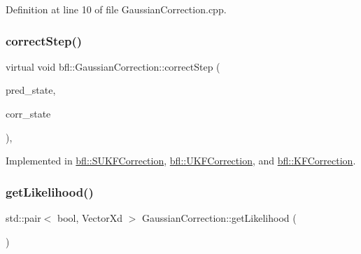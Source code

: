 Definition at line 10 of file Gaussian\+Correction.\+cpp.

\mbox{\label{classbfl_1_1GaussianCorrection_af30322d949e8135e1ec243bd6df00c18}} 
\subsubsection{\texorpdfstring{correct\+Step()}{correctStep()}}
{\footnotesize\ttfamily virtual void bfl\+::\+Gaussian\+Correction\+::correct\+Step (\begin{DoxyParamCaption}\item[{const \mbox{\hyperlink{classbfl_1_1GaussianMixture}{Gaussian\+Mixture}} \&}]{pred\+\_\+state,  }\item[{\mbox{\hyperlink{classbfl_1_1GaussianMixture}{Gaussian\+Mixture}} \&}]{corr\+\_\+state }\end{DoxyParamCaption})\hspace{0.3cm}{\ttfamily [protected]}, {}}



Implemented in \mbox{\hyperlink{classbfl_1_1SUKFCorrection_af58d64c5e6c1ef373df94e4c4179226b}{bfl\+::\+S\+U\+K\+F\+Correction}}, \mbox{\hyperlink{classbfl_1_1UKFCorrection_a08786378b99dbf0584edbba15bc89f99}{bfl\+::\+U\+K\+F\+Correction}}, and \mbox{\hyperlink{classbfl_1_1KFCorrection_ac97f8001212bd43071a1e4f2f7fe649d}{bfl\+::\+K\+F\+Correction}}.

\mbox{\label{classbfl_1_1GaussianCorrection_a955702adbdad6448d8f306752d3d0868}} 
\subsubsection{\texorpdfstring{get\+Likelihood()}{getLikelihood()}}
{\footnotesize\ttfamily std\+::pair$<$ bool, Vector\+Xd $>$ Gaussian\+Correction\+::get\+Likelihood (\begin{DoxyParamCaption}{ }\end{DoxyParamCaption})\hspace{0.3cm}{\ttfamily [virtual]}}



